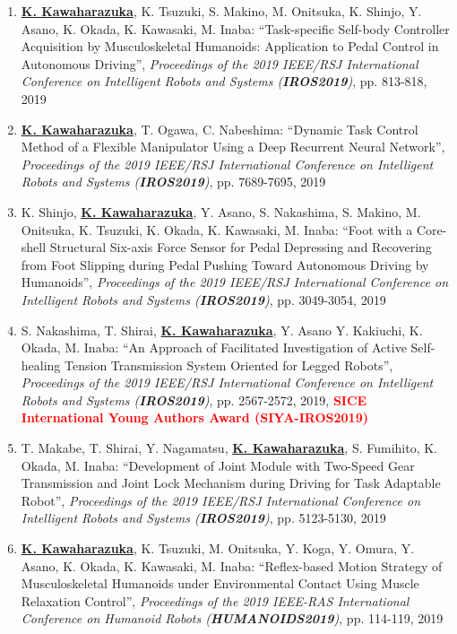 \documentclass[letterpaper]{article}
\begin{document}
\begin{enumerate}
\item \underline{\textbf{K. Kawaharazuka}}, K. Tsuzuki, S. Makino, M. Onitsuka, K. Shinjo, Y. Asano, K. Okada, K. Kawasaki, M. Inaba: ``Task-specific Self-body Controller Acquisition by Musculoskeletal Humanoids: Application to Pedal Control in Autonomous Driving'', \textit{Proceedings of the 2019 IEEE/RSJ International Conference on Intelligent Robots and Systems (\textit{\textbf{IROS2019}})}, pp. 813-818, 2019
\item \underline{\textbf{K. Kawaharazuka}}, T. Ogawa, C. Nabeshima: ``Dynamic Task Control Method of a Flexible Manipulator Using a Deep Recurrent Neural Network'', \textit{Proceedings of the 2019 IEEE/RSJ International Conference on Intelligent Robots and Systems (\textit{\textbf{IROS2019}})}, pp. 7689-7695, 2019
\item K. Shinjo, \underline{\textbf{K. Kawaharazuka}}, Y. Asano, S. Nakashima, S. Makino, M. Onitsuka, K. Tsuzuki, K. Okada, K. Kawasaki, M. Inaba: ``Foot with a Core-shell Structural Six-axis Force Sensor for Pedal Depressing and Recovering from Foot Slipping during Pedal Pushing Toward Autonomous Driving by Humanoids'', \textit{Proceedings of the 2019 IEEE/RSJ International Conference on Intelligent Robots and Systems (\textit{\textbf{IROS2019}})}, pp. 3049-3054, 2019
\item S. Nakashima, T. Shirai, \underline{\textbf{K. Kawaharazuka}}, Y. Asano Y. Kakiuchi, K. Okada, M. Inaba: ``An Approach of Facilitated Investigation of Active Self-healing Tension Transmission System Oriented for Legged Robots'', \textit{Proceedings of the 2019 IEEE/RSJ International Conference on Intelligent Robots and Systems (\textit{\textbf{IROS2019}})}, pp. 2567-2572, 2019, \textbf{\textcolor{red}{SICE International Young Authors Award (SIYA-IROS2019)}}
\item T. Makabe, T. Shirai, Y. Nagamatsu, \underline{\textbf{K. Kawaharazuka}}, S. Fumihito, K. Okada, M. Inaba: ``Development of Joint Module with Two-Speed Gear Transmission and Joint Lock Mechanism during Driving for Task Adaptable Robot'', \textit{Proceedings of the 2019 IEEE/RSJ International Conference on Intelligent Robots and Systems (\textit{\textbf{IROS2019}})}, pp. 5123-5130, 2019
\item \underline{\textbf{K. Kawaharazuka}}, K. Tsuzuki, M. Onitsuka, Y. Koga, Y. Omura, Y. Asano, K. Okada, K. Kawasaki, M. Inaba: ``Reflex-based Motion Strategy of Musculoskeletal Humanoids under Environmental Contact Using Muscle Relaxation Control'', \textit{Proceedings of the 2019 IEEE-RAS International Conference on Humanoid Robots (\textit{\textbf{HUMANOIDS2019}})}, pp. 114-119, 2019

\end{enumerate}
\end{document}
